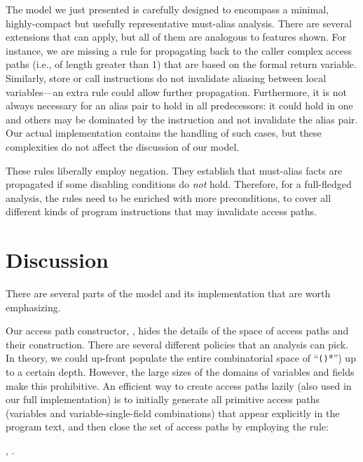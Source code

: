 The model we just presented is carefully designed to encompass a minimal, highly-compact but usefully representative must-alias analysis. There are several extensions that can apply, but all of them are analogous to features shown. For instance, we are missing a rule for propagating back to the caller complex access paths (i.e., of length greater than 1) that are based on the formal return variable. Similarly, store or call instructions do not invalidate aliasing between local variables---an extra rule could allow further propagation. Furthermore, it is not always necessary for an alias pair to hold in all predecessors: it could hold in one and others may be dominated by the instruction and not invalidate the alias pair. Our actual implementation contains the handling of such cases, but these complexities do not affect the discussion of our model.

These rules liberally employ negation. They establish that must-alias facts are propagated if some disabling conditions do \emph{not} hold. Therefore, for a full-fledged analysis, the rules need to be enriched with more preconditions, to cover all different kinds of program instructions that may invalidate access paths.


\section{Discussion}

There are several parts of the model and its implementation that are worth emphasizing.

Our access path constructor, , hides the details of the space of access paths and their construction. There are several different policies that an analysis can pick. In theory, we could up-front populate the entire combinatorial space of ``\texttt{()}*'') up to a certain depth. However, the large sizes of the domains of variables and fields make this prohibitive. An efficient way to create access paths lazily (also used in our full implementation) is to initially generate all primitive access paths (variables and variable-single-field combinations) that appear explicitly in the program text, and then close the set of access paths by employing the rule:

\begin{datalog}
 \dlIf{} , .
\end{datalog}

